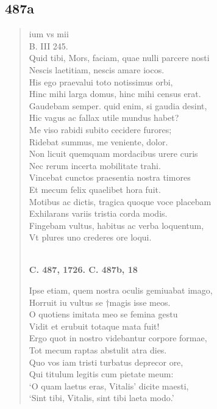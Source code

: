 \documentclass[11pt, a4paper]{report}
\begin{document}
            \subsection*{487a}
      \begin{verse}
      ium vs mii \\ B. III 245. \\ Quid tibi, Mors, faciam, quae nulli parcere nosti \\ Nescis laetitiam, nescis amare iocos. \\ His ego praevalui toto notissimus orbi, \\ Hinc mihi larga domus, hinc mihi census erat. \\ Gaudebam semper. quid enim, si gaudia desint, \\ Hic vagus ac fallax utile mundus habet? \\ Me viso rabidi subito cecidere furores; \\ Ridebat summus, me veniente, dolor. \\ Non licuit quemquam mordacibus urere curis \\ Nec rerum incerta mobilitate trahi. \\ Vincebat cunctos praesentia nostra timores \\ Et mecum felix quaelibet hora fuit. \\ Motibus ac dictis, tragica quoque voce placebam \\ Exhilarans variis tristia corda modis. \\ Fingebam vultus, habitus ac verba loquentum, \\ Vt plures uno crederes ore loqui. \\ 
        ﻿\pagebreak 
    \begin{center} \textbf{C. 487, 1726. C. 487b, 18} \end{center} \marginpar{[39]} Ipse etiam, quem nostra oculis gemiuabat imago, \\ Horruit iu vultus se †magis isse meos. \\ O quotiens imitata meo se femina gestu \\ Vidit et erubuit totaque mata fuit! \\ Ergo quot in nostro videbantur corpore formae, \\ Tot mecum raptas abstulit atra dies. \\ Quo vos iam tristi turbatus deprecor ore, \\ Qui titulum legitis cum pietate meum: \\ ‘O quam laetus eras, Vitalis’ dicite maesti, \\ ‘Sint tibi, Vitalis, sint tibi laeta modo.’ \\ 
      \end{verse}
  
\end{document}
